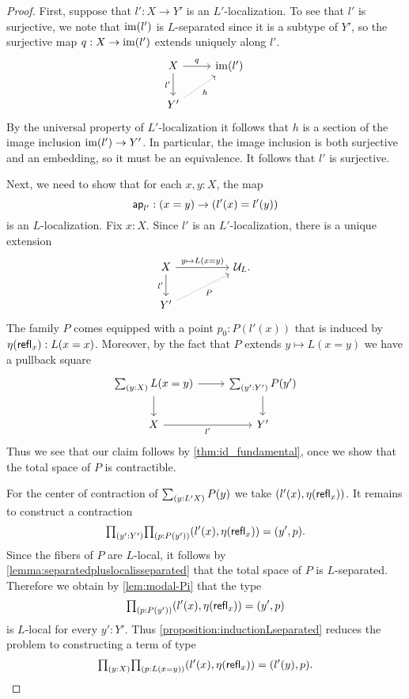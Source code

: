 \begin{proof}
First, suppose that $l':X\to Y'$ is an $L'$-localization. To see that $l'$ is surjective, we note that $\operatorname{im}(l')$ is $L$-separated since it is a subtype of $Y'$, so the surjective map $q:X\to\operatorname{im}(l')$ extends uniquely along $l'$. 
\[
  \begin{tikzcd}
    X \arrow[r,"q"] \arrow[d,swap,"l'"] & \im(l') \\
    Y' \arrow[ur,densely dotted,swap,"h"]
  \end{tikzcd}
\]
By the universal property of $L'$-localization it follows that $h$ is a section of the image inclusion $\operatorname{im}(l')\to Y'$. In particular, the image inclusion is both surjective and an embedding, so it must be an equivalence. It follows that $l'$ is surjective.

Next, we need to show that for each $x,y:X$, the map
\begin{equation*}
\mathsf{ap}_{l'}:(x=y)\to (l'(x)=l'(y))
\end{equation*}
is an $L$-localization. Fix $x : X$.
Since $l'$ is an $L'$-localization, there is a unique extension
\begin{equation*}
\begin{tikzcd}[column sep=huge]
X \arrow[r,"y\mapsto L(x=y)"] \arrow[d,swap,"{l'}"] & \UU_L. \\
Y' \arrow[ur,densely dotted,swap,"P"]
\end{tikzcd}
\end{equation*}
The family $P$ comes equipped with a point $p_0:P(l'(x))$ that is induced by $\eta(\mathsf{refl}_{x}):L(x=x)$. Moreover, by the fact that $P$ extends $y\mapsto L(x=y)$ we have a pullback square
\begin{equation*}
\begin{tikzcd}
\sm{y:X}L(x=y) \arrow[d] \arrow[r] & \sm{y':Y'}P(y') \arrow[d] \\
X \arrow[r,swap,"{l'}"] & Y'
\end{tikzcd}
\end{equation*}
Thus we see that our claim follows by \cref{thm:id_fundamental}, once we show that the total space of $P$ is contractible.

For the center of contraction of $\sm{y:L'X}P(y)$ we take $(l'(x),\eta(\mathsf{refl}_{x}))$.
It remains to construct a contraction
\begin{equation*}
\prd{y':Y'}{p:P(y')}(l'(x),\eta(\refl{x}))=(y',p).
\end{equation*}
Since the fibers of $P$ are $L$-local, it follows by \cref{lemma:separatedpluslocalisseparated} that the total space of $P$ is $L$-separated. Therefore we obtain by \cref{lem:modal-Pi} that the type
\[
  \prd{p:P(y')} (l'(x),\eta(\refl{x}))=(y',p)
\]
is $L$-local for every $y':Y'$. Thus \cref{proposition:inductionLseparated} reduces the problem to
constructing a term of type
\begin{equation*}
\prd{y:X}{p:L(x=y)}(l'(x),\eta(\refl{x}))=(l'(y),p).
\end{equation*}


\end{proof}
